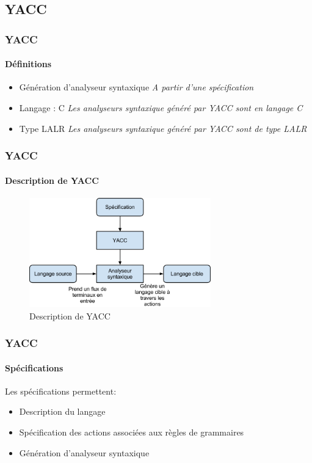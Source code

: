 \documentclass{beamer}
\begin{document}
\subsection{YACC}

\begin{frame}\frametitle{YACC}\framesubtitle{Définitions}

	\begin{itemize}
				\item Génération d'analyseur syntaxique\newline
						\subitem \textit{A partir d'une spécification}\newline
				\item Langage : C\newline
						\subitem \textit{Les analyseurs syntaxique généré par YACC sont en langage C}\newline
				\item Type LALR\newline
						\subitem \textit{Les analyseurs syntaxique généré par YACC sont de type LALR}\newline
	\end{itemize}

\end{frame}

\begin{frame}\frametitle{YACC}\framesubtitle{Description de YACC}

	\begin{figure}[h]
	\centering
		\includegraphics[width=0.70\textwidth]{yaccDiagramme.png}
	\caption{Description de YACC}
	\label{fig:yaccDiagramme}
	\end{figure}\FloatBarrier

\end{frame}

\begin{frame}\frametitle{YACC}\framesubtitle{Spécifications}

	Les spécifications permettent:

	\begin{itemize}
				\item Description du langage\newline
				\item Spécification des actions associées aux règles de grammaires\newline
				\item Génération d'analyseur syntaxique\newline
	\end{itemize}

\end{frame}
\end{document}
